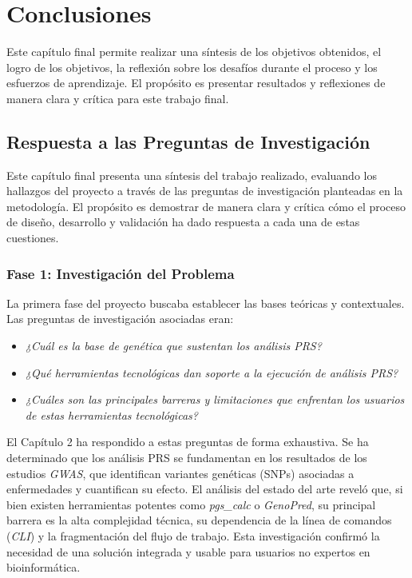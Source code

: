\chapter{Conclusiones}
\label{chap:conclusiones}

Este capítulo final permite realizar una síntesis de los objetivos obtenidos, el logro de los objetivos, la reflexión sobre los desafíos durante el proceso y los esfuerzos de aprendizaje. El propósito es presentar resultados y reflexiones de manera clara y crítica para este trabajo final.

\section{Respuesta a las Preguntas de Investigación}

Este capítulo final presenta una síntesis del trabajo realizado, evaluando los hallazgos del proyecto a través de las preguntas de investigación planteadas en la metodología. El propósito es demostrar de manera clara y crítica cómo el proceso de diseño, desarrollo y validación ha dado respuesta a cada una de estas cuestiones.

\subsection{Fase 1: Investigación del Problema}

La primera fase del proyecto buscaba establecer las bases teóricas y contextuales. Las preguntas de investigación asociadas eran:

\begin{itemize}
    \item \textit{¿Cuál es la base de genética que sustentan los análisis PRS?}
    \item \textit{¿Qué herramientas tecnológicas dan soporte a la ejecución de análisis PRS?}
    \item \textit{¿Cuáles son las principales barreras y limitaciones que enfrentan los usuarios de estas herramientas tecnológicas?}
\end{itemize}

El Capítulo 2 ha respondido a estas preguntas de forma exhaustiva. Se ha determinado que los análisis PRS se fundamentan en los resultados de los estudios \textit{GWAS}, que identifican variantes genéticas (SNPs) asociadas a enfermedades y cuantifican su efecto. El análisis del estado del arte reveló que, si bien existen herramientas potentes como \textit{pgs\_calc} o \textit{GenoPred}, su principal barrera es la alta complejidad técnica, su dependencia de la línea de comandos (\textit{CLI}) y la fragmentación del flujo de trabajo. Esta investigación confirmó la necesidad de una solución integrada y usable para usuarios no expertos en bioinformática.

